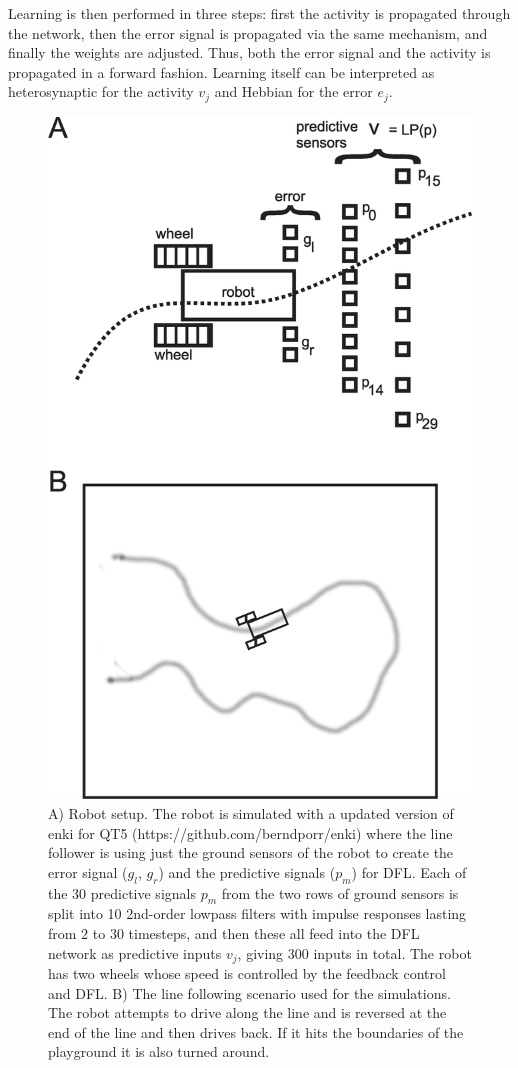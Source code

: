 \documentclass{aamas2018}
\begin{document}
Learning is then performed in three steps: first the activity is
propagated through the network, then the error signal is propagated
via the same mechanism, and finally the weights are adjusted. Thus,
both the error signal and the activity is propagated in a forward
fashion. Learning itself can be interpreted as heterosynaptic for the
activity $v_j$ and Hebbian for the error $e_j$.


\begin{figure}[!ht]
  \centering
  \includegraphics[width=0.9\columnwidth]{linefollower_robot_playground}
  \caption{A) Robot setup. The robot is simulated with a updated
    version of enki for QT5 (https://github.com/berndporr/enki)
    where the line follower is using just the ground sensors of the
    robot to create the error signal ($g_l$, $g_r$) and the predictive signals ($p_m$)
    for DFL. Each of the 30 predictive signals $p_m$ from the two rows of ground sensors
    is split into 10 2nd-order lowpass filters with impulse responses
    lasting from $2$ to $30$ timesteps, and then these all feed into the DFL
    network as predictive inputs $v_j$, giving 300 inputs in total.
    The robot has two wheels whose speed is controlled
    by the feedback control and DFL.
    B) The line following scenario used for the simulations. The robot
    attempts to drive along the line and is reversed at the end of the
    line and then drives back. If it hits the boundaries of the playground
    it is also turned around.
    \label{linefollower_robot_playground}}
\end{figure}
\end{document}
